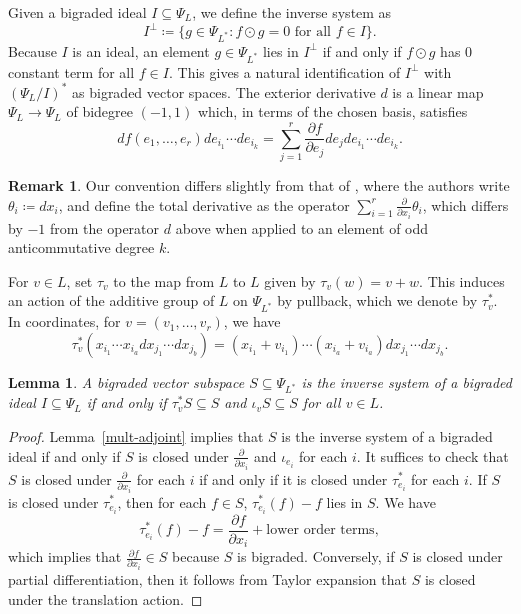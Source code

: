 \documentclass{amsart}
\newtheorem{lemma}[theorem]{Lemma}
\theoremstyle{definition}
\newtheorem{remark}[theorem]{Remark}
\begin{document}
Given a bigraded ideal $I \subseteq \Psi_L$, we define the inverse system as
\[
    I^\perp \coloneqq \{g \in \Psi_{L^*} : f\odot g = 0 \text{ for all 
    $f \in I$}\}.
\]
Because $I$ is an ideal, an element $g \in \Psi_{L^*}$ lies in $I^{\perp}$ if and only if $f \odot g$ has $0$ constant term for all $f \in I$. 
This gives a natural identification of $I^\perp$ with $(\Psi_L/I)^*$ as bigraded 
vector spaces.
The exterior derivative $d$ is a linear map $\Psi_L \to \Psi_L$ of bidegree $(-1, 1)$ which, in terms of the chosen basis, satisfies
$$d f(e_1, \dotsc, e_r) de_{i_1} \dotsb de_{i_k} = \sum_{j=1}^{r} \frac{\partial f}{\partial e_j} de_{j} de_{i_1} \dotsb de_{i_k}.$$
\begin{remark}
    Our convention differs slightly from that of \cite{Superspace}, 
    where the authors write $\theta_i \coloneqq dx_i$, and define the total 
    derivative as the operator $\sum_{i = 1}^r 
    \frac{\partial}{\partial x_i} \theta_i$, which differs by $-1$ 
    from the operator $d$ above when applied to an element of odd
    anticommutative degree $k$. 
\end{remark}

For $v \in L$, set $\tau_v$ to the map from $L$ to $L$ given by $\tau_v(w) = v + w$. 
This induces an action of the additive group of $L$ on $\Psi_{L^*}$ by pullback, 
which we denote by $\tau_v^*$. In coordinates, for $v = (v_1, \dotsc, v_r)$, we have
\[
    \tau_v^*(x_{i_1}\cdots x_{i_a} dx_{j_1} \cdots  dx_{j_b}) = (x_{i_1} + 
    v_{i_1})\cdots(x_{i_a}+v_{i_a}) dx_{j_1} \cdots dx_{j_b}.
\]

\begin{lemma}
    A bigraded vector subspace $S \subseteq \Psi_{L^*}$ is the inverse system 
    of a bigraded ideal $I \subseteq \Psi_L$ if and only if $\tau_v^* S 
    \subseteq S$ and $\iota_v S \subseteq S$ for all $v \in L$.
\end{lemma}
\begin{proof}
Lemma~\ref{mult-adjoint} implies that $S$ is the inverse system of a bigraded ideal if and only if $S$ is closed under $\frac{\partial}{\partial x_i}$ and $\iota_{e_i}$ for each $i$. 
It suffices to check that $S$ is closed under $\frac{\partial}{\partial x_i}$ for each $i$ if and only if it is closed under $\tau_{e_i}^*$ for each $i$. If $S$ is closed under $\tau_{e_i}^*$, then for each $f \in S$, $\tau_{e_i}^*(f) - f$ lies in $S$. We have
    \[
        \tau_{e_i}^*(f) - f = \frac{\partial f}{\partial x_i} + 
        \text{lower order terms},
    \]
    which implies that $\frac{\partial f}{\partial x_i} \in S$ because 
    $S$ is bigraded. Conversely, if $S$ is closed under partial differentiation, then it follows from Taylor expansion that $S$ is closed under the translation action. 
\end{proof}
\end{document}
